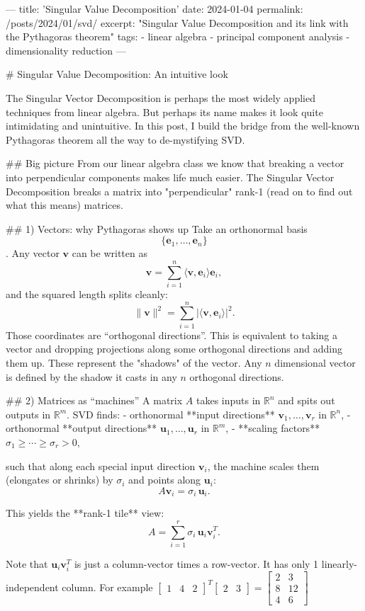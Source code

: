 ---
title: 'Singular Value Decomposition'
date: 2024-01-04
permalink: /posts/2024/01/svd/
excerpt: "Singular Value Decomposition and its link with the Pythagoras theorem"
tags:
  - linear algebra
  - principal component analysis
  - dimensionality reduction
---

# Singular Value Decomposition: An intuitive look

The Singular Vector Decomposition is perhaps the most widely applied techniques from linear algebra. But perhaps its name makes it look quite intimidating and unintuitive. In this post, I build the bridge from the well-known Pythagoras theorem all the way to de-mystifying SVD.

## Big picture 
From our linear algebra class we know that breaking a vector into perpendicular components makes life much easier. The Singular Vector Decomposition breaks a matrix into "perpendicular" rank-1 (read on to find out what this means) matrices. 

## 1) Vectors: why Pythagoras shows up
Take an orthonormal basis $$\{\mathbf{e}_1,\dots,\mathbf{e}_n\}$$. Any vector $\mathbf{v}$ can be written as
$$
\mathbf{v}=\sum_{i=1}^n \langle \mathbf{v},\mathbf{e}_i\rangle \mathbf{e}_i,
$$
and the squared length splits cleanly:
$$
\|\mathbf{v}\|^2=\sum_{i=1}^n \big|\langle \mathbf{v},\mathbf{e}_i\rangle\big|^2.
$$
Those coordinates are “orthogonal directions”. This is equivalent to taking a vector and dropping projections along some orthogonal directions and adding them up. These represent the "shadows" of the vector. Any $n$ dimensional vector is defined by the shadow it casts in any $n$ orthogonal directions.


## 2) Matrices as “machines”
A matrix $A$ takes inputs in $\mathbb{R}^n$ and spits out outputs in $\mathbb{R}^m$. SVD finds:
- orthonormal **input directions** $\mathbf{v}_1,\dots,\mathbf{v}_r$ in $\mathbb{R}^n$,
- orthonormal **output directions** $\mathbf{u}_1,\dots,\mathbf{u}_r$ in $\mathbb{R}^m$,
- **scaling factors** $\sigma_1\ge \cdots \ge \sigma_r>0$,

such that along each special input direction $\mathbf{v}_i$, the machine scales them (elongates or shrinks) by $\sigma_i$ and points along $\mathbf{u}_i$:
$$
A\mathbf{v}_i=\sigma_i\,\mathbf{u}_i.
$$

This yields the **rank-1 tile** view:
$$
A=\sum_{i=1}^r \sigma_i\,\mathbf{u}_i\mathbf{v}_i^T.
$$

Note that $\mathbf{u}_i\mathbf{v}_i^T$ is just a column-vector times a row-vector. It has only 1 linearly-independent column. For example $\begin{bmatrix} 1 & 4 & 2\end{bmatrix}^T\begin{bmatrix} 2 & 3 \end{bmatrix} =\begin{bmatrix} 2 & 3 \\ 8 & 12 \\ 4 & 6 \end{bmatrix}$

